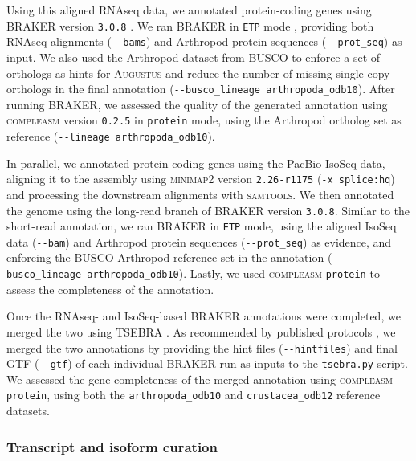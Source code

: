 Using this aligned RNAseq data, we annotated protein-coding genes using \textsc{BRAKER}
version \texttt{3.0.8} \citep{gabriel_braker3_2024}. We ran \textsc{BRAKER} in
\texttt{ETP} mode \citep{bruna_genemark-etp_2024}, providing both RNAseq alignments
(\texttt{-{}-bams}) and Arthropod protein sequences (\texttt{-{}-prot\_seq}) as input.
We also used the Arthropod dataset from \textsc{BUSCO} \citep{simao_busco_2015} to
enforce a set of orthologs as hints for \textsc{Augustus} \citep{stanke_using_2008}
and reduce the number of missing single-copy orthologs in the final annotation
(\texttt{-{}-busco\_lineage arthropoda\_odb10}). After running \textsc{BRAKER}, we assessed
the quality of the generated annotation using \textsc{compleasm} version \texttt{0.2.5}
\citep{huang_compleasm_2023} in \texttt{protein} mode, using the Arthropod ortholog set
as reference (\texttt{-{}-lineage arthropoda\_odb10}).
\vspace{0.1cm}

In parallel, we annotated protein-coding genes using the PacBio IsoSeq data, aligning it
to the assembly using \textsc{minimap2} version \texttt{2.26-r1175} (\texttt{-x splice:hq})
and processing the downstream alignments with \textsc{samtools}. We then annotated the
genome using the long-read branch of \textsc{BRAKER} version \texttt{3.0.8}. Similar to
the short-read annotation, we ran \textsc{BRAKER} in \texttt{ETP} mode, using the aligned
IsoSeq data (\texttt{-{}-bam}) and Arthropod protein sequences (\texttt{-{}-prot\_seq}) as
evidence, and enforcing the \textsc{BUSCO} Arthropod reference set in the annotation
(\texttt{-{}-busco\_lineage arthropoda\_odb10}). Lastly, we used \textsc{compleasm}
\texttt{protein} to assess the completeness of the annotation.
\vspace{0.1cm}

Once the RNAseq- and IsoSeq-based \textsc{BRAKER} annotations were completed, we merged
the two using \textsc{TSEBRA} \citep{gabriel_tsebra_2021}. As recommended by published
protocols \citep{bonizzoni_navigating_2025}, we merged the two annotations by providing
the hint files (\texttt{-{}-hintfiles}) and final GTF (\texttt{-{}-gtf}) of each
individual \textsc{BRAKER} run as inputs to the \texttt{tsebra.py} script. We assessed
the gene-completeness of the merged annotation using \textsc{compleasm} \texttt{protein},
using both the \texttt{arthropoda\_odb10} and \texttt{crustacea\_odb12} reference datasets.

\subsubsection*{Transcript and isoform curation}

